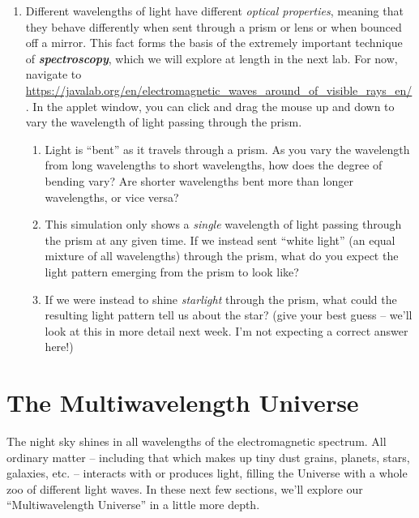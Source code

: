 \documentclass[11pt]{article}
\begin{document}
\begin{enumerate}
    \item Different wavelengths of light have different \emph{optical properties}, meaning that they behave differently when sent through a prism or lens or when bounced off a mirror. This fact forms the basis of the extremely important technique of \textbf{\emph{spectroscopy}}, which we will explore at length in the next lab. For now, navigate to \url{https://javalab.org/en/electromagnetic_waves_around_of_visible_rays_en/}. In the applet window, you can click and drag the mouse up and down to vary the wavelength of light passing through the prism.
    \begin{enumerate}
        \item Light is ``bent'' as it travels through a prism. As you vary the wavelength from long wavelengths to short wavelengths, how does the degree of bending vary? Are shorter wavelengths bent more than longer wavelengths, or vice versa?
        
        \item This simulation only shows a \emph{single} wavelength of light passing through the prism at any given time. If we instead sent ``white light'' (an equal mixture of all wavelengths) through the prism, what do you expect the light pattern emerging from the prism to look like? 
        
        \item If we were instead to shine \emph{starlight} through the prism, what could the resulting light pattern tell us about the star? (give your best guess -- we'll look at this in more detail next week. I'm not expecting a correct answer here!)
        
    \end{enumerate}
\end{enumerate}

\section{The Multiwavelength Universe}
The night sky shines in all wavelengths of the electromagnetic spectrum. All ordinary matter -- including that which makes up tiny dust grains, planets, stars, galaxies, etc. -- interacts with or produces light, filling the Universe with a whole zoo of different light waves. In these next few sections, we'll explore our ``Multiwavelength Universe'' in a little more depth.
\end{document}
